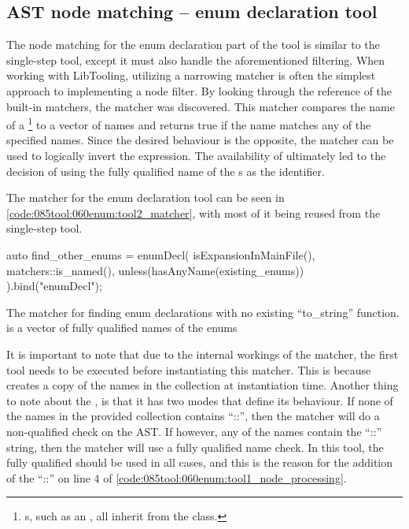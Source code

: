 \pagebreak
\subsection{AST node matching -- enum declaration tool}\label{subsubsec:080dev:085examples:060enum:matching_second_tool}
The node matching for the enum declaration part of the tool is similar to the single-step tool, except it must also handle the aforementioned filtering.
When working with LibTooling, utilizing a narrowing matcher is often the simplest approach to implementing a node filter.
By looking through the reference of the built-in matchers, the   matcher was discovered.
This matcher compares the name of a \footnote{s, such as an , all inherit from the  class.} to a vector of names and returns true if the name matches any of the specified names.
Since the desired behaviour is the opposite, the matcher  can be used to logically invert the expression.
The availability of  ultimately led to the decision of using the fully qualified name of the s as the identifier.

The matcher for the enum declaration tool can be seen in \cref{code:085tool:060enum:tool2_matcher}, with most of it being reused from the single-step tool.

\begin{listing}[H]
  \begin{cppcode}
auto find_other_enums = enumDecl(
    isExpansionInMainFile(),
    matchers::is_named(),
    unless(hasAnyName(existing_enums))
  ).bind("enumDecl");
  \end{cppcode}
  \caption{The matcher for finding enum declarations with no existing ``to\_string'' function.  is a vector of fully qualified names of the enums }
  \label{code:085tool:060enum:tool2_matcher}
\end{listing}

It is important to note that due to the internal workings of the  matcher, the first tool needs to be executed before instantiating this matcher.
This is because  creates a copy of the names in the collection at instantiation time.
Another thing to note about the , is that it has two modes that define its behaviour.
If none of the names in the provided collection contains ``::'', then the matcher will do a non-qualified check on the AST. If however, any of the names contain the ``::'' string, then the matcher will use a fully qualified name check. In this tool, the fully qualified should be used in all cases, and this is the reason for the addition of the ``::'' on line 4 of \cref{code:085tool:060enum:tool1_node_processing}.

